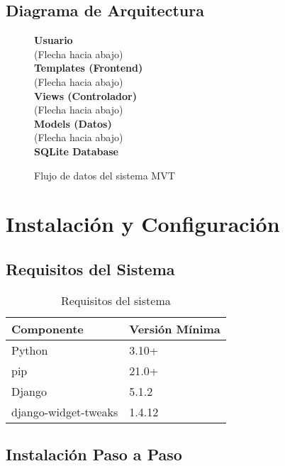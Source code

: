 \documentclass[11pt,a4paper]{report}
\begin{document}
	\subsection{Diagrama de Arquitectura}
	
	\begin{figure}[h!]
		\centering
		\begin{tcolorbox}[width=0.9\textwidth,colback=gray!10!white,colframe=gray!75!black]
			\begin{center}
				\textbf{Usuario} \\
				(Flecha hacia abajo) \\
				\textbf{Templates (Frontend)} \\
				(Flecha hacia abajo) \\
				\textbf{Views (Controlador)} \\
				(Flecha hacia abajo) \\
				\textbf{Models (Datos)} \\
				(Flecha hacia abajo) \\
				\textbf{SQLite Database}
			\end{center}
		\end{tcolorbox}
		\caption{Flujo de datos del sistema MVT}
		\label{fig:architecture}
	\end{figure}
	
	\section{Instalación y Configuración}
	
	\subsection{Requisitos del Sistema}
	
	\begin{table}[h!]
		\centering
		\begin{tabular}{@{}ll@{}}
			\toprule
			\textbf{Componente} & \textbf{Versión Mínima} \\
			\midrule
			Python & 3.10+ \\
			pip & 21.0+ \\
			Django & 5.1.2 \\
			django-widget-tweaks & 1.4.12 \\
			\bottomrule
		\end{tabular}
		\caption{Requisitos del sistema}
		\label{tab:requirements}
	\end{table}
	
	\subsection{Instalación Paso a Paso}
	
\end{document}
